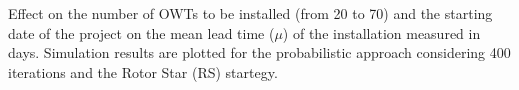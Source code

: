\label{fig:effectnumber}
Effect on the number of OWTs to be installed (from 20 to 70) and the starting date of the project on the mean lead time ($\mu$) of the installation measured in days. Simulation results are plotted for the probabilistic approach considering 400 iterations and the Rotor Star (RS) startegy.